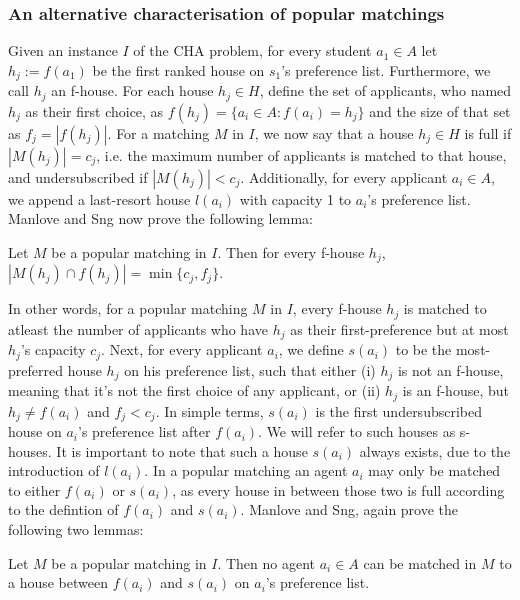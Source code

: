 \subsubsection{An alternative characterisation of popular matchings}
Given an instance $I$ of the CHA problem, for every student $a_1 \in A$ let $h_j := f(a_1)$ be the first ranked house on $s_1$'s preference list. Furthermore, we call $h_j$ an f-house. For each house $h_j \in H$, define the set of applicants, who named $h_j$ as their first choice, as $f(h_j) = \{a_i \in A: f(a_i) = h_j\}$ and the size of that set as $f_j = |f(h_j)|$. For a matching $M$ in $I$, we now say that a house $h_j \in H$ is full if $|M(h_j)| = c_j$, i.e. the maximum number of applicants is matched to that house, and undersubscribed if $|M(h_j)| < c_j$. Additionally, for every applicant $a_i \in A$, we append a last-resort house $l(a_i)$ with capacity 1 to $a_i$'s preference list.\cite{ManlovePopularMatchings} Manlove and Sng now prove the following lemma\cite{ManlovePopularMatchings}:
\newtheorem{lemma-popular-1}[theorem]{Lemma}
\begin{lemma}\label{lemma-popular1}
    Let $M$ be a popular matching in $I$. Then for every f-house $h_j$, $|M(h_j) \cap f(h_j)| = \min\{c_j, f_j\}$.
\end{lemma} 
In other words, for a popular matching $M$ in $I$, every f-house $h_j$ is matched to atleast the number of applicants who have $h_j$ as their first-preference but at most $h_j$'s capacity $c_j$. Next, for every applicant $a_i$, we define $s(a_i)$ to be the most-preferred house $h_j$ on his preference list, such that either (i) $h_j$  is not an f-house, meaning that it's not the first choice of any applicant, or (ii) $h_j$ is an f-house, but $h_j \neq f(a_i)$ and $f_j < c_j$. In simple terms, $s(a_i)$ is the first undersubscribed house on $a_i$'s preference list after $f(a_i)$. We will refer to such houses as s-houses. It is important to note that such a house $s(a_i)$ always exists, due to the introduction of $l(a_i)$. In a popular matching an agent $a_i$ may only be matched to either $f(a_i)$ or $s(a_i)$, as every house in between those two is full according to the defintion of $f(a_i)$ and $s(a_i)$. Manlove and Sng, again prove the following two lemmas\cite{ManlovePopularMatchings}: 

\newtheorem{lemma-popular-2}[theorem]{Lemma}
\begin{lemma}\label{lemma-popular2}
    Let $M$ be a popular matching in $I$. Then no agent $a_i \in A$ can be matched in $M$ to a house between $f(a_i)$ and $s(a_i)$ on $a_i$'s preference list.
\end{lemma} 


